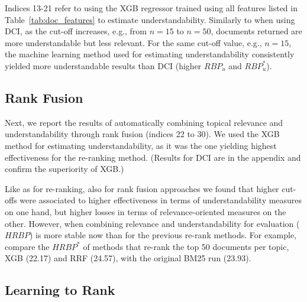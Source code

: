 Indices 13-21 refer to using the XGB regressor trained using all features listed in Table~\ref{tab:doc_features} to estimate understandability. Similarly to when using DCI, as the cut-off increases, e.g., from $n=15$ to $n=50$, documents returned are more understandable but less relevant. For the same cut-off value, e.g., $n=15$, the machine learning method used for estimating understandability consistently yielded more understandable results than DCI (higher $RBP_u$ and $RBP_u^*$). 


\subsection{Rank Fusion}
\label{results:fusion}

Next, we report the results of automatically combining topical relevance and understandability through rank fusion (indices 22 to 30). We used the XGB method for estimating understandability, as it was the one yielding highest effectiveness for the re-ranking method. (Results for DCI are in the appendix and confirm the superiority of XGB.) 

Like as for re-ranking, also for rank fusion approaches we found that higher cut-offs were associated to higher effectiveness in terms of understandability measures on one hand, but higher losses in terms of relevance-oriented measures on the other. 
However, when combining relevance and understandability for evaluation ($HRBP$) is more stable now than for the previous re-rank methods. 
For example, compare the $HRBP^*$ of methods that re-rank the top 50 documents per topic, XGB (22.17) and RRF (24.57), with the original BM25 run (23.93).

\subsection{Learning to Rank}
\label{results:ltr}


